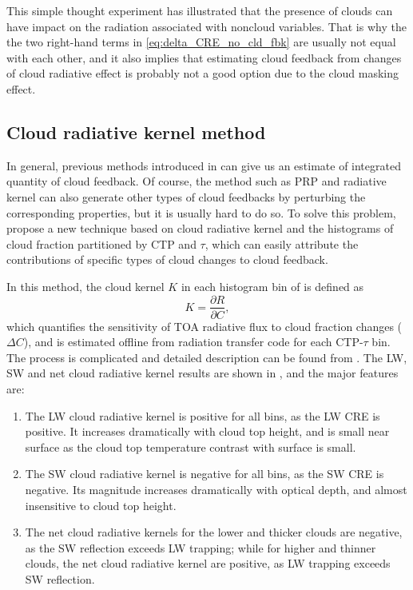 This simple thought experiment has illustrated that the presence of clouds can have impact on the radiation associated with noncloud variables. That is why the the two right-hand terms in \eqref{eq:delta_CRE_no_cld_fbk} are usually not equal with each other, and it also implies that estimating cloud feedback from changes of cloud radiative effect is probably not a good option due to the cloud masking effect.

\subsection{Cloud radiative kernel method}
\label{sec:Zelinka_method}

In general, previous methods introduced in  can give us an estimate of integrated quantity of cloud feedback. Of course, the method such as PRP and radiative kernel can also generate other types of cloud feedbacks by perturbing the corresponding properties, but it is usually hard to do so. To solve this problem, \cite{Zelinka2012computing1,Zelinka2012computing2} propose a new technique based on cloud radiative kernel  and the histograms of cloud fraction partitioned by CTP and $\tau$, which can easily attribute the contributions of specific types of cloud changes to cloud feedback.

In this method, the cloud kernel $K$ in each histogram bin of  is defined as
\begin{equation}
    K = \frac{\partial R}{\partial C},
\end{equation}
which quantifies the sensitivity of TOA radiative flux to cloud fraction changes ($\Delta C$), and is estimated offline from radiation transfer code for each CTP-$\tau$ bin. The process is complicated and detailed description can be found from \cite{Zelinka2012computing1}. The LW, SW and net cloud radiative kernel results are shown in , and the major features are:
\begin{enumerate}
    \item The LW cloud radiative kernel is positive for all bins, as the LW CRE is positive. It increases dramatically with cloud top height, and is small near surface as the cloud top temperature contrast with surface is small.
    \item The SW cloud radiative kernel is negative for all bins, as the SW CRE is negative. Its magnitude increases dramatically with optical depth, and almost insensitive to cloud top height.
    \item The net cloud radiative kernels for the lower and thicker clouds are negative, as the SW reflection exceeds LW trapping; while for higher and thinner clouds, the net cloud radiative kernel are positive, as LW trapping exceeds SW reflection.
\end{enumerate}

